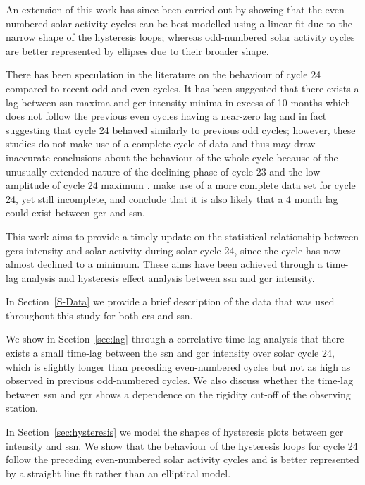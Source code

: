 An extension of this work has since been carried out by \citet{inceoglu_modeling_2014} showing that the even numbered solar activity cycles can be best modelled using a linear fit due to the narrow shape of the hysteresis loops; whereas odd-numbered solar activity cycles are better represented by ellipses due to their broader shape.

There has been speculation in the literature on the behaviour of cycle 24 compared to recent odd and even cycles. It has been suggested that there exists a lag between \gls{ssn} maxima and \gls{gcr} intensity minima in excess of 10 months \citep{kane_lags_2014, mishra_study_2016} which does not follow the previous even cycles having a near-zero lag and in fact suggesting that cycle 24 behaved similarly to previous odd cycles; however, these studies do not make use of a complete cycle of data and thus may draw inaccurate conclusions about the behaviour of the whole cycle because of the unusually extended nature of the declining phase of cycle 23 and the low amplitude of cycle 24 maximum \citep{broomhall_helioseismic_2017}. \cite{mishra_study_2016} make use of a more complete data set for cycle 24, yet still incomplete, and conclude that it is also likely that a 4 month lag could exist between \gls{gcr} and \gls{ssn}.

This work aims to provide a timely update on the statistical relationship between \glspl{gcr} intensity and solar activity during solar cycle 24, since the cycle has now almost declined to a minimum. These aims have been achieved through a time-lag analysis and hysteresis effect analysis between \gls{ssn} and \gls{gcr} intensity.

In Section~\ref{S-Data} we provide a brief description of the data that was used throughout this study for both \glspl{cr} and \gls{ssn}.

We show in Section~\ref{sec:lag} through a correlative time-lag analysis that there exists a small time-lag between the \gls{ssn} and \gls{gcr} intensity over solar cycle 24, which is slightly longer than preceding even-numbered cycles but not as high as observed in previous odd-numbered cycles. We also discuss whether the time-lag between \gls{ssn} and \gls{gcr} shows a dependence on the rigidity cut-off of the observing station. 

In Section~\ref{sec:hysteresis} we model the shapes of hysteresis plots between \gls{gcr} intensity and \gls{ssn}. We show that the behaviour of the hysteresis loops for cycle 24 follow the preceding even-numbered solar activity cycles and is better represented by a straight line fit rather than an elliptical model.


